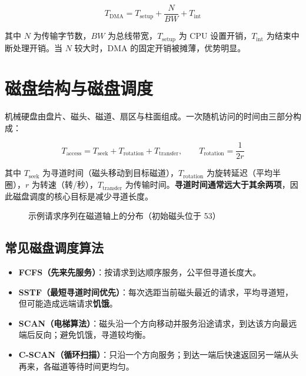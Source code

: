 \begin{equation}
T_{\text{DMA}} = T_{\text{setup}} + \frac{N}{BW} + T_{\text{int}}
\end{equation}

其中 $N$ 为传输字节数，$BW$ 为总线带宽，$T_{\text{setup}}$ 为 CPU 设置开销，$T_{\text{int}}$ 为结束中断处理开销。当 $N$ 较大时，DMA 的固定开销被摊薄，优势明显。

\section{磁盘结构与磁盘调度}

机械硬盘由盘片、磁头、磁道、扇区与柱面组成。一次随机访问的时间由三部分构成：

\begin{equation}
T_{\text{access}} = T_{\text{seek}} + T_{\text{rotation}} + T_{\text{transfer}}, \qquad T_{\text{rotation}} = \frac{1}{2r}
\end{equation}

其中 $T_{\text{seek}}$ 为寻道时间（磁头移动到目标磁道），$T_{\text{rotation}}$ 为旋转延迟（平均半圈），$r$ 为转速（转/秒），$T_{\text{transfer}}$ 为传输时间。\textbf{寻道时间通常远大于其余两项}，因此磁盘调度的核心目标是减少寻道长度。

\begin{figure}[H]
\centering
{}
\caption{示例请求序列在磁道轴上的分布（初始磁头位于 53）}
\end{figure}

\subsection{常见磁盘调度算法}

\begin{itemize}
    \item \textbf{FCFS（先来先服务）}：按请求到达顺序服务，公平但寻道长度大。
    \item \textbf{SSTF（最短寻道时间优先）}：每次选距当前磁头最近的请求，平均寻道短，但可能造成远端请求\textbf{饥饿}。
    \item \textbf{SCAN（电梯算法）}：磁头沿一个方向移动并服务沿途请求，到达该方向最远端后反向；避免饥饿，寻道较均衡。
    \item \textbf{C-SCAN（循环扫描）}：只沿一个方向服务；到达一端后快速返回另一端从头再来，各磁道等待时间更均匀。
\end{itemize}

